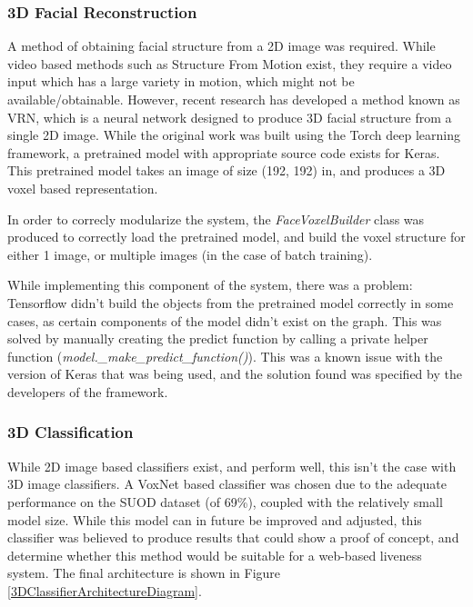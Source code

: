 \documentclass[11pt,a4paper]{article}
\begin{document}
        \subsubsection{3D Facial Reconstruction}
            A method of obtaining facial structure from a 2D image was required. While video based methods such as Structure From Motion exist, they require a video input which has a large variety in motion, which might not be available/obtainable.
            However, recent research has developed a method known as VRN, which is a neural network designed to produce 3D facial structure from a single 2D image. \cite{3DReconstructionMethod}
            While the original work was built using the Torch deep learning framework, a pretrained model with appropriate source code exists for Keras. \cite{VRNTorchToKeras} This pretrained model
            takes an image of size (192, 192) in, and produces a 3D voxel based representation. 

            In order to correcly modularize the system, the \emph{FaceVoxelBuilder} class was produced to correctly load the pretrained model, and build the voxel structure for either 1 image, or multiple images (in the case of batch training).

            While implementing this component of the system, there was a problem: Tensorflow didn't build the objects from the pretrained model correctly in some cases, as certain components of the model didn't exist on the graph. This was solved by manually creating the predict function by calling a private helper function (\emph{model.\_make\_predict\_function()}).
            This was a known issue with the version of Keras that was being used, and the solution found was specified by the developers of the framework. \cite{KerasVoxNetBug}

        \subsubsection{3D Classification}
            While 2D image based classifiers exist, and perform well, this isn't the case with 3D image classifiers. A VoxNet based classifier was chosen due to the adequate performance on the SUOD dataset (of 69\%),
            coupled with the relatively small model size. \cite{VoxNetModel} While this model can in future be improved and adjusted, this classifier was believed to produce results that could show a proof of concept,
            and determine whether this method would be suitable for a web-based liveness system. The final architecture is shown in Figure \ref{3DClassifierArchitectureDiagram}.
\end{document}
